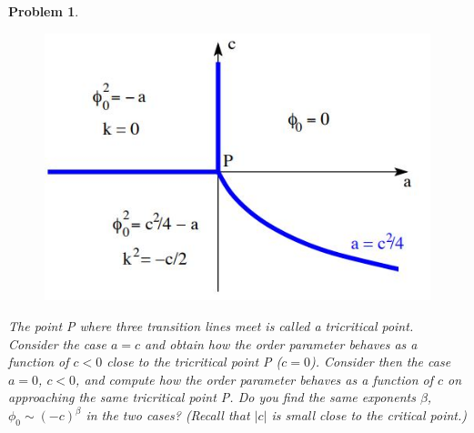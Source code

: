 \documentclass[a4paper]{article}
\theoremstyle{new}
\newtheorem{qns}{Problem}[section]
\begin{document}
\begin{qns}
\begin{enumerate}[label=(\alph*)]
\begin{figure}[H]
    \centering
    \includegraphics[scale=0.65]{TP1_Q3_PT.JPG}
\end{figure}
The point P where three transition lines meet is called a tricritical point. Consider the case $a = c$ and obtain how the order parameter behaves as a function of $c < 0$ close to the tricritical point P ($c = 0$). Consider then the case $a = 0$, $c < 0$, and compute how the order parameter behaves as a function of $c$ on approaching the same tricritical point P. Do you find the same exponents $\beta$, $\phi_0\sim(-c)^\beta$ in the two cases? (Recall that $|c|$ is small close to the critical point.)
\end{enumerate}
\end{qns}
\end{document}
